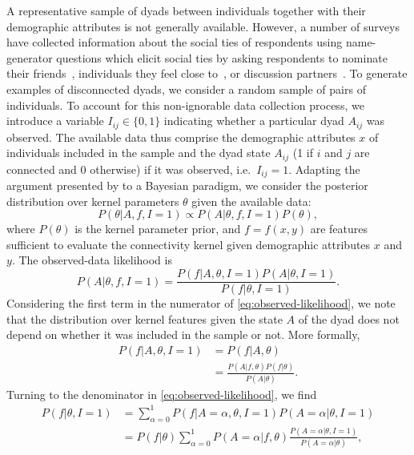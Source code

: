 \documentclass{scrartcl}
\newcommand{\observed}[1]{#1}
\begin{document}
A representative sample of dyads between individuals together with their demographic attributes is not generally available. However, a number of surveys have collected information about the social ties of respondents using name-generator questions which elicit social ties by asking respondents to nominate their friends~\cite{Kalmijn2007}, individuals they feel close to~\cite{Hipp2009}, or discussion partners~\cite{Marsden1987,McPherson2006}. To generate examples of disconnected dyads, we consider a random sample of pairs of individuals. To account for this non-ignorable data collection process, we introduce a variable $I_{ij}\in\{0,1\}$ indicating whether a particular dyad $A_{ij}$ was observed. The available data thus comprise the demographic attributes $x$ of individuals included in the sample and the dyad state $A_{ij}$ (1 if $i$ and $j$ are connected and $0$ otherwise) if it was observed, i.e.\ $I_{ij}=1$. Adapting the argument presented by \textcite{King2001} to a Bayesian paradigm, we consider the posterior distribution over kernel parameters $\theta$ given the available data:
\begin{equation}
    P(\theta|\observed{A}, \observed{f}, I=1)\propto P(\observed{A}|\theta,\observed{f},I=1)P(\theta),\label{eq:parameter-posterior}
\end{equation}
where $P(\theta)$ is the kernel parameter prior, and $f=f(x,y)$ are features sufficient to evaluate the connectivity kernel given demographic attributes $x$ and $y$. The observed-data likelihood is
\begin{equation}
    P(\observed{A}|\theta,\observed{f},I=1)=\frac{P(\observed{f}|\observed{A},\theta,I=1)P(\observed{A}|\theta,I=1)}{P(\observed{f}|\theta,I=1)}.\label{eq:observed-likelihood}
\end{equation}
Considering the first term in the numerator of \cref{eq:observed-likelihood}, we note that the distribution over kernel features given the state $A$ of the dyad does not depend on whether it was included in the sample or not. More formally,
\begin{align}
    P(f|A,\theta,I=1)&=P(f|A,\theta)\\
    &=\frac{P(A|f,\theta)P(f|\theta)}{P(A|\theta)}.\label{eq:conditional-equivalence}
\end{align}
Turning to the denominator in \cref{eq:observed-likelihood}, we find
\begin{align}
    P(f|\theta,I=1)&=\sum_{\alpha=0}^1 P(f|A=\alpha,\theta,I=1)P(A=\alpha|\theta,I=1)\nonumber\\
    &=P(f|\theta)\sum_{\alpha=0}^1 P(A=\alpha|f,\theta)\frac{P(A=\alpha|\theta,I=1)}{P(A=\alpha|\theta)},\label{eq:likelihood-denominator}
\end{align}
\end{document}
